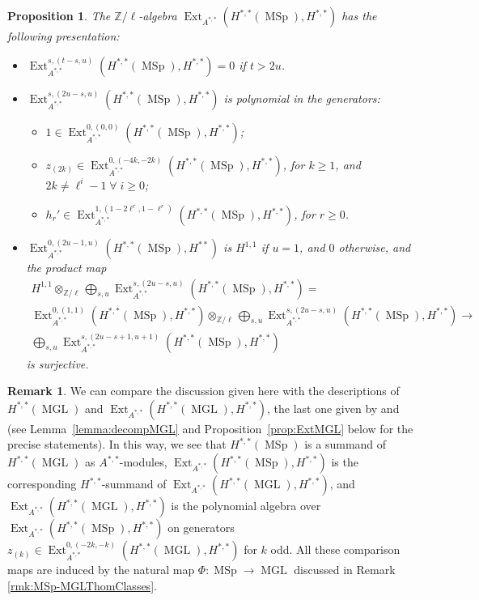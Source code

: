 \documentclass[10pt]{amsart}
\theoremstyle{definition}
\newtheorem{rmk}[defn]{Remark}
\theoremstyle{plain}
\newtheorem{prop}[defn]{Proposition}
\numberwithin{equation}{section}
\newcommand{\0}{\emptyset}
\newcommand{\Z}{{\mathbb Z}}
\newcommand{\MGL}{{\operatorname{MGL}}}
\newcommand{\MSp}{{\operatorname{MSp}}}
\newcommand{\Ext}{{\operatorname{Ext}}}
\begin{document}
    \begin{prop}
    \label{prop:pres.ExtAlgebra}
        The $\mathbb{Z}/\ell$-algebra $\Ext_{A^{*,*}}(H^{*,*}(\MSp),H^{*,*})$ has the following presentation:
        \begin{itemize}
            \item $\Ext_{A^{*,*}}^{s,(t-s,u)}(H^{*,*}(\MSp),H^{*,*})=0$ if $t>2u$.
            \item $\Ext_{A^{*,*}}^{s,(2u-s,u)}(H^{*,*}(\MSp),H^{*,*})$ is polynomial in the generators:
            \begin{itemize}
                \item $1 \in \Ext_{A^{*,*}}^{0,(0,0)}(H^{*,*}(\MSp),H^{*,*})$;
                \item $z_{(2k)}\in \Ext_{A^{*,*}}^{0,(-4k,-2k)}(H^{*,*}(\MSp),H^{*,*})$, for $k\ge 1$, and $2k\neq \ell^i-1 \; \forall \; i \ge 0 $;
                \item $h_r' \in \Ext_{A^{*,*}}^{1,(1-2 \ell^r,1-\ell^r)}(H^{*,*}(\MSp),H^{*,*})$, for $r \ge 0$.
            \end{itemize}
            \item $\Ext_{A^{*,*}}^{0,(2u-1,u)}(H^{*,*}(\MSp),H^{**})$ is $H^{1,1}$ if $u=1$, and $0$ otherwise, and the product map
        \begin{multline*}
            H^{1,1} \otimes_{\Z/\ell} \bigoplus_{s,u}\Ext_{A^{*,*}}^{s,(2u-s,u)}(H^{*,*}(\MSp),H^{*,*}) = \\ \Ext_{A^{*,*}}^{0,(1,1)}(H^{*,*}(\MSp),H^{*,*}) \otimes_{\Z/\ell} \bigoplus_{s,u}\Ext_{A^{*,*}}^{s,(2u-s,u)}(H^{*,*}(\MSp),H^{*,*}) \to \\ \bigoplus_{s,u} \Ext_{A^{*,*}}^{s,(2u-s+1,u+1)}(H^{*,*}(\MSp),H^{*,*})
        \end{multline*}
        is surjective.
        \end{itemize}
    \end{prop}
  
  \begin{rmk} We can compare the discussion given here with the descriptions of $H^{*,*}(\MGL)$ and $\Ext_{A^{*,*}}(H^{*,*}(\MGL),H^{*,*})$, the last one given by \cite[Lemma 5.9]{lev:ellcoh} and \cite[Proposition 5.7]{lev:ellcoh} (see Lemma~\ref{lemma:decompMGL} and Proposition~\ref{prop:ExtMGL} below for the precise statements). In this way, we see that $H^{*,*}(\MSp)$ is a summand of $H^{*,*}(\MGL)$ as $A^{*,*}$-modules, $\Ext_{A^{*,*}}(H^{*,*}(\MSp),H^{*,*})$ is the corresponding $H^{*,*}$-summand of $\Ext_{A^{*,*}}(H^{*,*}(\MGL),H^{*,*})$,  and $\Ext_{A^{*,*}}(H^{*,*}(\MGL),H^{*,*})$ is the polynomial algebra over $\Ext_{A^{*,*}}(H^{*,*}(\MSp),H^{*,*})$ on generators $z_{(k)}\in \Ext_{A^{*,*}}^{0,(-2k,-k)}(H^{*,*}(\MGL),H^{*,*})$ for $k$ odd. All these comparison maps are induced by the natural map $\Phi: \MSp\to \MGL$ discussed in Remark \ref{rmk:MSp-MGLThomClasses}. 
   \end{rmk}
\end{document}
